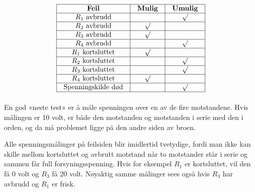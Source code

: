 
$$\vbox{\offinterlineskip
\halign{\strut
\vrule \quad\hfil # \ \hfil & 
\vrule \quad\hfil # \ \hfil & 
\vrule \quad\hfil # \ \hfil \vrule \cr
\noalign{\hrule}
%
{\bf Feil} & {\bf Mulig} & {\bf Umulig} \cr
%
\noalign{\hrule}
%
$R_1$ avbrudd &  & $\surd$ \cr
%
\noalign{\hrule}
%
$R_2$ avbrudd & $\surd$ &  \cr
%
\noalign{\hrule}
%
$R_3$ avbrudd & $\surd$ &  \cr
%
\noalign{\hrule}
%
$R_4$ avbrudd &  & $\surd$ \cr
%
\noalign{\hrule}
%
$R_1$ kortsluttet & $\surd$ &  \cr
%
\noalign{\hrule}
%
$R_2$ kortsluttet &  & $\surd$ \cr
%
\noalign{\hrule}
%
$R_3$ kortsluttet &  & $\surd$ \cr
%
\noalign{\hrule}
%
$R_4$ kortsluttet & $\surd$ &  \cr
%
\noalign{\hrule}
%
Spenningskilde død &  & $\surd$ \cr
%
\noalign{\hrule}
} %
}$$ %

En god «neste test» er å måle spenningen over en av de fire motstandene. Hvis målingen er 10 volt, er både den motstanden og motstanden i serie med den i orden, og da må problemet ligge på den andre siden av broen.

Alle spenningsmålinger på feilsiden blir imidlertid tvetydige, fordi man ikke kan skille mellom kortsluttet og avbrutt motstand når to motstander står i serie og sammen får full forsyningsspenning. Hvis for eksempel $R_1$ er kortsluttet, vil den få 0 volt og $R_3$ få 20 volt. Nøyaktig samme målinger sees også hvis $R_3$ har avbrudd og $R_1$ er frisk.



